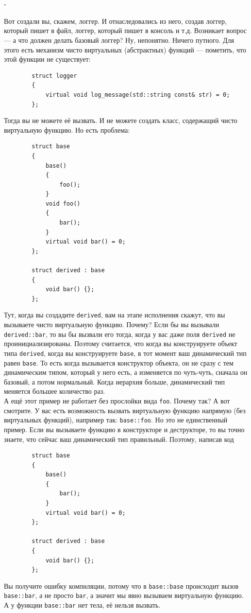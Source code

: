 \documentclass{article}
\begin{document}
    \paragraph{.}
    Вот создали вы, скажем, логгер. И отнаследовались из него, создав логгер, который пишет в файл, логгер, который пишет в консоль и т.д. Возникает вопрос --- а что должен делать базовый логгер? Ну, непонятно. Ничего путного. Для этого есть механизм чисто виртуальных (абстрактных) функций --- пометить, что этой функции не существует:
    \begin{verbatim}
        struct logger
        {
            virtual void log_message(std::string const& str) = 0;
        };
    \end{verbatim}
    Тогда вы не можете её вызвать. И не можете создать класс, содержащий чисто виртуальную функцию. Но есть проблема:
    \begin{verbatim}
        struct base
        {
            base()
            {
                foo();
            }
            void foo()
            {
                bar();
            }
            virtual void bar() = 0;
        };

        struct derived : base
        {
            void bar() {};
        };
    \end{verbatim}
    Тут, когда вы создадите \texttt{derived}, вам на этапе исполнения скажут, что вы вызываете чисто виртуальную функцию. Почему? Если бы вы вызывали \texttt{derived::bar}, то вы бы вызвали его тогда, когда у вас даже поля \texttt{derived} не проинициализированы. Поэтому считается, что когда вы конструируете объект типа \texttt{derived}, когда вы конструируете \texttt{base}, в тот момент ваш динамический тип равен \texttt{base}. То есть когда вызывается конструктор объекта, он не сразу с тем динамическим типом, который у него есть, а изменяется по чуть-чуть, сначала он базовый, а потом нормальный. Когда иерархия больше, динамический тип меняется большее количество раз.\\
    А ещё этот пример не работает без прослойки вида \texttt{foo}. Почему так? А вот смотрите. У вас есть возможность вызвать виртуальную функцию напрямую (без виртуальных функций), например так: \texttt{base::foo}. Но это не единственный пример. Если вы вызываете функцию в конструкторе и деструкторе, то вы точно знаете, что сейчас ваш динамический тип правильный. Поэтому, написав код
    \begin{verbatim}
        struct base
        {
            base()
            {
                bar();
            }
            virtual void bar() = 0;
        };
        
        struct derived : base
        {
            void bar() {};
        };
    \end{verbatim}
    Вы получите ошибку компиляции, потому что в \texttt{base::base} происходит вызов \texttt{base::bar}, а не просто \texttt{bar}, а значит мы явно вызываем виртуальную функцию. А у функции \texttt{base::bar} нет тела, её нельзя вызвать.
\end{document}
